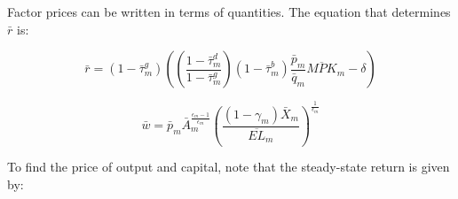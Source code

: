 \documentclass[letterpaper,12pt]{article}
\theoremstyle{definition}
\begin{document}
\begin{spacing}{1.5}
%
%


Factor prices can be written in terms of quantities.  The equation that determines $\bar{r}$ is:

\begin{equation}
\bar{r} = (1-\bar{\tau}^{g}_{m})\left(\left(\frac{1-\bar{\tau}^{d}_{m}}{1-\bar{\tau}^{g}_{m}}\right)(1-\bar{\tau}^{b}_{m})\frac{\bar{p}_{m}}{\bar{q}_{m}}\overline{MPK}_{m} - \delta \right)
\end{equation}

\begin{equation}
\bar{w} = \bar{p}_{m}\bar{A}_{m}^{\frac{\epsilon_{m}-1}{\epsilon_{m}}}\left(\frac{(1-\gamma_{m})\bar{X}_{m}}{\overline{EL}_{m}} \right)^{\frac{1}{\epsilon_{m}}} 
\end{equation}

To find the price of output and capital, note that the steady-state return is given by:


\end{spacing}
\end{document}
